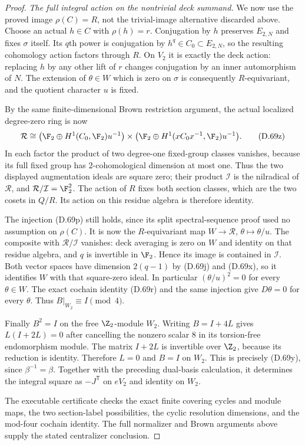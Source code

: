 \begin{proof}
\emph{The full integral action on the nontrivial deck summand.}
We now use the proved image $\rho(C)=R$, not the
trivial-image alternative discarded above.
Choose an actual $h\in C$ with $\rho(h)=r$.
Conjugation by $h$ preserves $E_{2,N}$ and fixes
$\sigma$ itself. Its $q$th power is conjugation
by $h^q\in C_0\subset E_{2,N}$, so the resulting
cohomology action factors through $R$.
On $V_2$ it is exactly the deck action: replacing
$h$ by any other lift of $r$ changes conjugation
by an inner automorphism of $N$.
The extension of $\theta\in W$ which is zero on
$\sigma$ is consequently $R$-equivariant, and
the quotient character $u$ is fixed.

By the same finite-dimensional Brown restriction
argument, the actual localized degree-zero ring is now
\[
 \mathcal R\cong
 \bigl(\F_2\oplus H^1(C_0,\F_2)u^{-1}\bigr)
 \times
 \bigl(\F_2\oplus H^1(xC_0x^{-1},\F_2)u^{-1}\bigr).
                                                               \tag{D.69z}
\]
In each factor the product of two degree-one fixed-group
classes vanishes, because its full fixed group has
$2$-cohomological dimension at most one.
Thus the two displayed augmentation ideals are square
zero; their product $\mathcal I$ is the nilradical of
$\mathcal R$, and $\mathcal R/\mathcal I=\F_2^2$.
The action of $R$ fixes both section classes, which
are the two cosets in $Q/R$. Its action on this
residue algebra is therefore identity.

The injection (D.69p) still holds, since its split
spectral-sequence proof used no assumption on
$\rho(C)$. It is now the $R$-equivariant map
$W\to\mathcal R$, $\theta\mapsto\theta/u$.
The composite with $\mathcal R/\mathcal I$ vanishes:
deck averaging is zero on $W$ and identity on that
residue algebra, and $q$ is invertible in $\F_2$.
Hence its image is contained in $\mathcal I$.
Both vector spaces have dimension $2(q-1)$ by
(D.69j) and (D.69x), so it identifies $W$ with
that square-zero ideal.
In particular $(\theta/u)^2=0$ for every $\theta\in W$.
The exact cochain identity (D.69r) and the same
injection give $D\theta=0$ for every $\theta$.
Thus $B|_{W_2}\equiv I\pmod4$.

Finally $B^2=I$ on the free $\Z_2$-module $W_2$.
Writing $B=I+4L$ gives
$L(I+2L)=0$ after cancelling the nonzero scalar
$8$ in its torsion-free endomorphism module.
The matrix $I+2L$ is invertible over $\Z_2$,
because its reduction is identity.
Therefore $L=0$ and $B=I$ on $W_2$.
This is precisely (D.69y), since $\beta^{-1}=\beta$.
Together with the preceding dual-basis calculation,
it determines the integral square as
$-J^{\mathsf T}$ on $eV_2$ and identity on $W_2$.

The executable certificate
checks the exact finite covering cycles and module maps,
the two section-label possibilities, the cyclic
resolution dimensions, and the mod-four cochain identity.
The full normalizer and Brown arguments above supply
the stated centralizer conclusion.
\end{proof}

